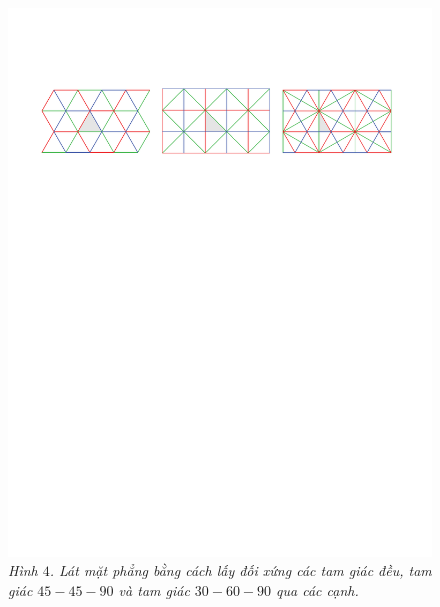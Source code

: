 	\begin{figure}[H]
		\vspace*{-5pt}
		\centering
		\captionsetup{labelformat= empty, justification=centering}
		\includegraphics[width= 1\linewidth]{4}
		\caption{\small\textit{\color{duongvaotoanhoc}Hình $4$. Lát mặt phẳng bằng cách lấy đối xứng các tam giác đều, tam giác $45-45-90$ và tam giác $30-60-90$ qua các cạnh.}}
		\vspace*{-10pt}
	\end{figure}
